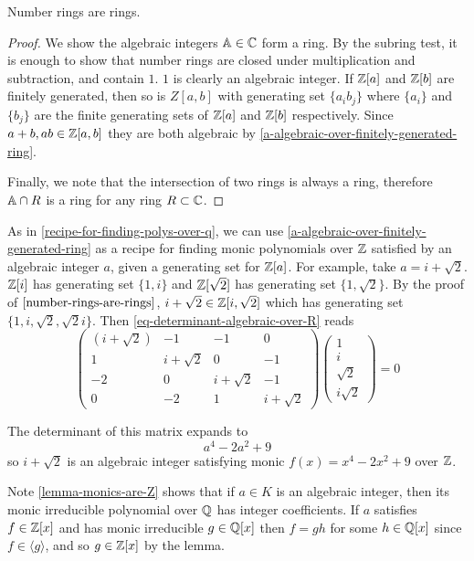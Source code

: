 \begin{corollary}\label{number-rings-are-rings}
Number rings are rings.
\end{corollary}
\begin{proof}
We show the algebraic integers $\mathbb{A}\in \mathbb{C}$ form a ring. By the subring test, it is enough to show that number rings are closed under multiplication and subtraction, and contain $1$. $1$ is clearly an algebraic integer. If $\mathbb{Z}[a]$ and $\mathbb{Z}[b]$ are finitely generated, then so is $Z[a,b]$ with generating set $\{a_ib_j\}$ where $\{a_i\}$ and $\{b_j\}$ are the finite generating sets of $\mathbb{Z}[a]$ and $\mathbb{Z}[b]$ respectively. Since $a+b,ab\in \mathbb{Z}[a,b]$ they are both algebraic by \cref{a-algebraic-over-finitely-generated-ring}.

Finally, we note that the intersection of two rings is always a ring, therefore $\mathbb{A}\cap R$ is a ring for any ring $R\subset \mathbb{C}$.
\end{proof}
\begin{example}
As in \cref{recipe-for-finding-polys-over-q}, we can use \cref{a-algebraic-over-finitely-generated-ring} as a recipe for finding monic polynomials over $\mathbb{Z}$ satisfied by an algebraic integer $a$, given a generating set for $\mathbb{Z}[a]$. For example, take $a=i+\sqrt{2}$. $\mathbb{Z}[i]$ has generating set $\{1,i\}$ and $\mathbb{Z}[\sqrt{2}]$ has generating set $\{1,\sqrt{2}\}$. By the proof of $\cref{number-rings-are-rings}$, $i+\sqrt{2}\in\mathbb{Z}[i,\sqrt{2}]$ which has generating set $\{1,i,\sqrt{2},\sqrt{2}i\}$. Then \cref{eq-determinant-algebraic-over-R} reads
$$\begin{pmatrix}
(i+\sqrt{2}) & -1 & -1 & 0\\ 
1 & i+\sqrt{2} & 0 & -1\\
-2 & 0 & i+\sqrt{2} & -1\\
0 & -2 & 1 & i+\sqrt{2}
\end{pmatrix}\begin{pmatrix}1\\i\\\sqrt{2}\\i\sqrt{2}\end{pmatrix}=0$$

The determinant of this matrix expands to
$$a^4-2a^2+9$$
so $i+\sqrt{2}$ is an algebraic integer satisfying monic $f(x)=x^4-2x^2+9$ over $\mathbb{Z}$.
\end{example}

\begin{remark}\label{algebraic-integer-irreducible-poly-has-integer-coefficients}
Note \cref{lemma-monics-are-Z} shows that if $a\in K$ is an algebraic integer, then its monic irreducible polynomial over $\mathbb{Q}$ has integer coefficients. If $a$ satisfies $f\in \mathbb{Z}[x]$ and has monic irreducible $g\in \mathbb{Q}[x]$ then $f=gh$ for some $h\in \mathbb{Q}[x]$ since $f\in \langle g \rangle$, and so $g\in \mathbb{Z}[x]$ by the lemma.
\end{remark}

